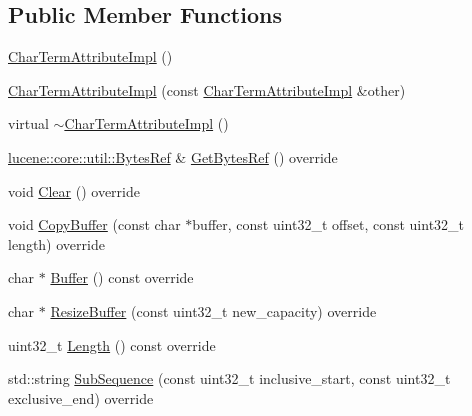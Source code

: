 \subsection*{Public Member Functions}
\begin{DoxyCompactItemize}
\item 
\mbox{\hyperlink{classlucene_1_1core_1_1analysis_1_1tokenattributes_1_1CharTermAttributeImpl_a3f0f1dfd6edd1686f46fa84b95b17959}{Char\+Term\+Attribute\+Impl}} ()
\item 
\mbox{\hyperlink{classlucene_1_1core_1_1analysis_1_1tokenattributes_1_1CharTermAttributeImpl_af846d32513f9e11a0b7443ea0ba41487}{Char\+Term\+Attribute\+Impl}} (const \mbox{\hyperlink{classlucene_1_1core_1_1analysis_1_1tokenattributes_1_1CharTermAttributeImpl}{Char\+Term\+Attribute\+Impl}} \&other)
\item 
virtual \mbox{\hyperlink{classlucene_1_1core_1_1analysis_1_1tokenattributes_1_1CharTermAttributeImpl_aef0a9228f5cf3d4ad4c33d97f2a9a13b}{$\sim$\+Char\+Term\+Attribute\+Impl}} ()
\item 
\mbox{\hyperlink{classlucene_1_1core_1_1util_1_1BytesRef}{lucene\+::core\+::util\+::\+Bytes\+Ref}} \& \mbox{\hyperlink{classlucene_1_1core_1_1analysis_1_1tokenattributes_1_1CharTermAttributeImpl_aefef8491e2a12493480fe19dd6d61ca7}{Get\+Bytes\+Ref}} () override
\item 
void \mbox{\hyperlink{classlucene_1_1core_1_1analysis_1_1tokenattributes_1_1CharTermAttributeImpl_a4e0b1a5a06996822798414f3a41af6e6}{Clear}} () override
\item 
void \mbox{\hyperlink{classlucene_1_1core_1_1analysis_1_1tokenattributes_1_1CharTermAttributeImpl_aacb3a44d6999a381dc9217616ba91317}{Copy\+Buffer}} (const char $\ast$buffer, const uint32\+\_\+t offset, const uint32\+\_\+t length) override
\item 
char $\ast$ \mbox{\hyperlink{classlucene_1_1core_1_1analysis_1_1tokenattributes_1_1CharTermAttributeImpl_af6663b6b4481ee51bd166f5c3123f9f8}{Buffer}} () const override
\item 
char $\ast$ \mbox{\hyperlink{classlucene_1_1core_1_1analysis_1_1tokenattributes_1_1CharTermAttributeImpl_abc195e8927e23632d34d4c081ede76b4}{Resize\+Buffer}} (const uint32\+\_\+t new\+\_\+capacity) override
\item 
uint32\+\_\+t \mbox{\hyperlink{classlucene_1_1core_1_1analysis_1_1tokenattributes_1_1CharTermAttributeImpl_a20085f30b788448e61de1f5635cd95f0}{Length}} () const override
\item 
std\+::string \mbox{\hyperlink{classlucene_1_1core_1_1analysis_1_1tokenattributes_1_1CharTermAttributeImpl_a286d2dd38ce24fb0da4c077e8f06bb25}{Sub\+Sequence}} (const uint32\+\_\+t inclusive\+\_\+start, const uint32\+\_\+t exclusive\+\_\+end) override

\end{DoxyCompactItemize}
